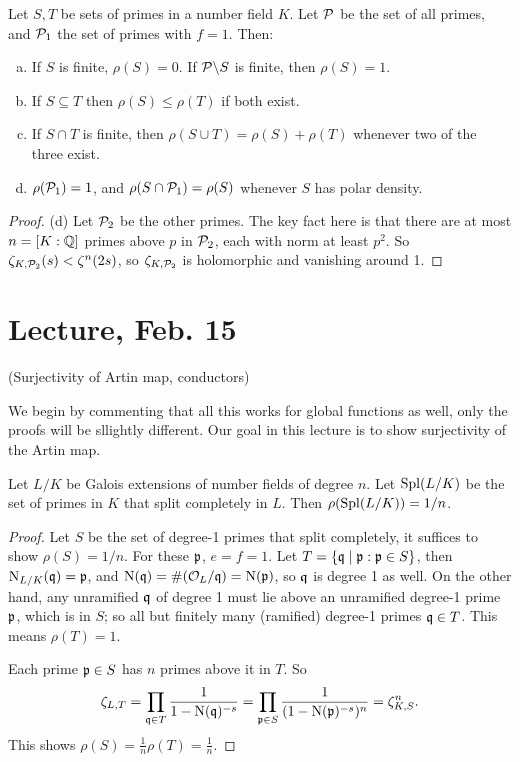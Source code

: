 \documentclass[11pt]{amsart}
\begin{document}
\begin{prop}
    Let $S,T$ be sets of primes in a number field $K$. Let $\mathcal{P}$ be the set of all primes, and $\mathcal{P}_1$ the set of primes with $f = 1$. Then:
    \begin{enumerate}[(a)]
        \item If $S$ is finite, $\rho(S) = 0$. If $\mathcal{P}\backslash S$ is finite, then $\rho(S) = 1$.
        \item If $S\subseteq T$ then $\rho(S)\le \rho(T)$ if both exist.
        \item If $S\cap T$ is finite, then $\rho(S\cup T) = \rho(S) + \rho(T)$ whenever two of the three exist.
        \item $\rho(\mathcal{P}_1) = 1$, and $\rho(S\cap \mathcal{P}_1) = \rho(S)$ whenever $S$ has polar density.
    \end{enumerate}
\end{prop}

\begin{proof}
    (d) Let $\mathcal{P}_2$ be the other primes. The key fact here is that there are at most $n = [K:\mathbb{Q}]$ primes above $p$ in $\mathcal{P}_2$, each with norm at least $p^2$. So $\zeta_{K,\mathcal{P}_2}(s) < \zeta^n(2s)$, so $\zeta_{K,\mathcal{P}_2}$ is holomorphic and vanishing around 1.
\end{proof}


\section{Lecture, Feb. 15}

(Surjectivity of Artin map, conductors)

We begin by commenting that all this works for global functions as well, only the proofs will be sllightly different. Our goal in this lecture is to show surjectivity of the Artin map.

\begin{thm}
    Let $L/K$ be Galois extensions of number fields of degree $n$. Let $\operatorname{Spl}(L/K)$ be the set of primes in $K$ that split completely in $L$. Then $\rho(\operatorname{Spl}(L/K)) = 1/n$.
\end{thm}

\begin{proof}
    Let $S$ be the set of degree-1 primes that split completely, it suffices to show $\rho(S) = 1/n$. For these $\mathfrak{p}$, $e = f = 1$. Let $T = \{\mathfrak{q}\mid \mathfrak{p}: \mathfrak{p}\in S\}$, then $\operatorname{N}_{L/K}(\mathfrak{q}) = \mathfrak{p}$, and $\operatorname{N}(\mathfrak{q}) = \#(\mathcal{O}_L/\mathfrak{q}) = \operatorname{N}(\mathfrak{p})$, so $\mathfrak{q}$ is degree 1 as well. On the other hand, any unramified $\mathfrak{q}$ of degree 1 must lie above an unramified degree-1 prime $\mathfrak{p}$, which is in $S$; so all but finitely many (ramified) degree-1 primes $\mathfrak{q}\in T$. This means $\rho(T) = 1$.

    Each prime $\mathfrak{p}\in S$ has $n$ primes above it in $T$. So
    \[\zeta_{L, T} = \prod_{\mathfrak{q}\in T} \frac{1}{1 - \operatorname{N}(\mathfrak{q})^{-s}} = \prod_{\mathfrak{p}\in S} \frac{1}{(1-\operatorname{N}(\mathfrak{p})^{-s})^n} = \zeta_{K, S}^n.\]
    This shows $\rho(S) = \frac1n\rho(T) = \frac1n$.
\end{proof}
\end{document}
